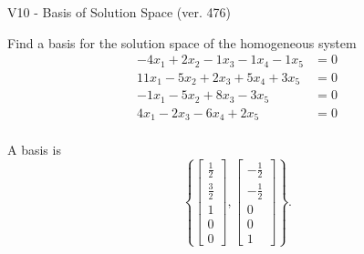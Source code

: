 \begin{exercise}
  \begin{exerciseTitle}V10 - Basis of Solution Space (ver. 476)\end{exerciseTitle}
  \begin{exerciseStatement}
    Find a basis for the solution space of the homogeneous system 
\begin{align*}
 -4 x_ 1 + 2 x_ 2 -1 x_ 3 -1 x_ 4 -1 x_ 5 &= 0  \\ 
  11 x_ 1 -5 x_ 2 + 2 x_ 3 + 5 x_ 4 + 3 x_ 5 &= 0  \\ 
  -1 x_ 1 -5 x_ 2 + 8 x_ 3 -3 x_ 5 &= 0  \\ 
  4 x_ 1 -2 x_ 3 -6 x_ 4 + 2 x_ 5 &= 0  \\ 
 \end{align*}


 
  \end{exerciseStatement}

  \begin{exerciseAnswer}
   A basis is   
\[\left\{\left[\begin{array}{c}
\frac{1}{2} \\
\frac{3}{2} \\
1 \\
0 \\
0
\end{array}\right] , \left[\begin{array}{c}
-\frac{1}{2} \\
-\frac{1}{2} \\
0 \\
0 \\
1
\end{array}\right]\right\}.\]

  


  \end{exerciseAnswer}
\end{exercise}